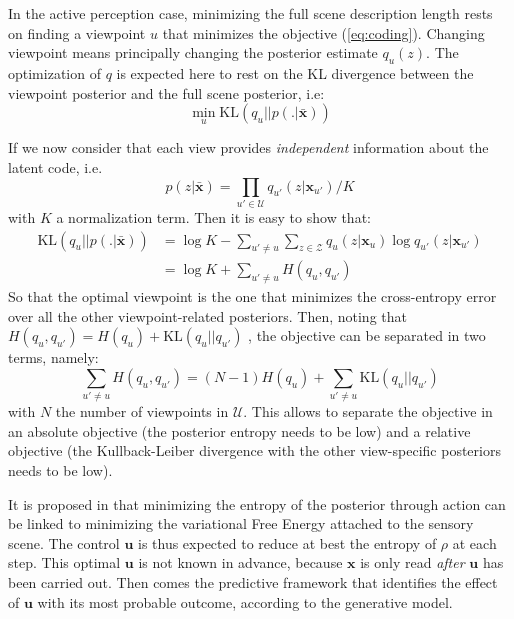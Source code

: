 \documentclass{article}
\begin{document}
In the active perception case, minimizing the full scene description length rests on finding a viewpoint $u$  that minimizes the objective (\ref{eq:coding}). Changing viewpoint means principally changing the posterior estimate $q_u(z)$. The optimization of $q$ is expected here to rest on the KL divergence between the viewpoint posterior and the full scene posterior, i.e:
$$\min_u \text{KL} (q_u||p(.|\bar{\boldsymbol{x}}))$$ 

If we now consider that each view provides \emph{independent} information about the latent code, i.e.  $$p(z|\bar{\boldsymbol{x}}) = \prod_{u'\in \mathcal{U}} q_{u'}(z|\boldsymbol{x}_{u'}) /K$$ 
with $K$ a normalization term. Then it is easy to show that:
\begin{align}
\text{KL}(q_u||p(.|\bar{\boldsymbol{x}})) 
&= \log K - \sum_{u' \neq u} \sum_{z \in \mathcal{Z}} q_u(z|\boldsymbol{x}_u) \log q_{u'}(z|\boldsymbol{x}_{u'})\nonumber\\
&= \log K + \sum_{u' \neq u} H(q_u, q_{u'})
\end{align}
So that the optimal viewpoint is the one that minimizes the cross-entropy error over all the other viewpoint-related posteriors. 
Then, noting that $H(q_u, q_{u'}) = H(q_u) + \text{KL}(q_u||q_{u'})$ , the objective can be separated in two terms, namely:
$$\sum_{u' \neq u} H(q_u, q_{u'}) = (N - 1) H(q_u) + \sum_{u' \neq u} \text{KL}(q_u||q_{u'})$$
with $N$ the number of viewpoints in $\mathcal{U}$.
This allows to separate the objective in an absolute objective (the posterior entropy needs to be low) and a relative objective (the Kullback-Leiber divergence with the other view-specific posteriors needs to be low).

It is proposed in \cite{friston2012perceptions} that minimizing the entropy of the posterior through action can be linked to minimizing the variational Free Energy attached to the sensory scene. 
The control $\boldsymbol{u}$ is thus expected to reduce at best the entropy of $\rho$ at each step. This optimal $\boldsymbol{u}$ is not known in advance, because $\boldsymbol{x}$ is only read \emph{after} $\boldsymbol{u}$ has been carried out. Then comes the predictive framework that identifies the effect of $\boldsymbol{u}$ with its most probable outcome, according to the generative model.
\end{document}
